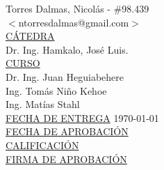 \documentclass[a4paper,12pt]{article}
\numberwithin{equation}{section}
\numberwithin{figure}{section}
\begin{document}
\begin{titlepage}
\begin{tabbing}
			Torres Dalmas, Nicolás	\>\>- \#98.439\\
			\>\footnotesize{$<$ntorresdalmas@gmail.com$>$}\\
			
			\<\underline{CÁTEDRA}\\[0.2cm]
			Dr. Ing. Hamkalo, José Luis. \\
			
			\<\underline{CURSO}\\[0.2cm]
			Dr. Ing. Juan Heguiabehere \\
			Ing. Tomás Niño Kehoe \\
			Ing. Matías Stahl \\[1cm]
			
			\<\underline{FECHA DE ENTREGA}\>\>\> \today
			\\[0.2cm]
			
			\<\underline{FECHA DE APROBACIÓN}\>\>\> 
			\\[0.2cm]
			
			\<\underline{CALIFICACIÓN}\>\>\> 
			\\[0.2cm]
			
			\<\underline{FIRMA DE APROBACIÓN}
			\\[0.5cm]
			
		\end{tabbing}
		
		
		
		
	\end{titlepage}
	
	\clearpage
	
	\tableofcontents							
	
	\clearpage
	
	
\end{document}
